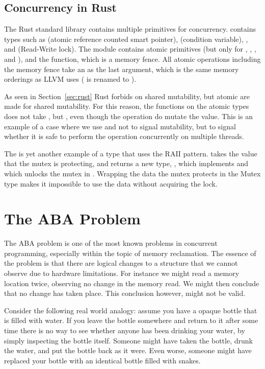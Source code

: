 \documentclass[b5paper]{report}
\begin{document}
\subsection{Concurrency in Rust}

The Rust standard library contains multiple primitives for concurrency.
 contains types such as  (atomic reference counted
smart pointer),  (condition variable), , and
 (Read-Write lock). The  module contains
atomic primitives (but only for , , , and
), and the  function, which is a memory fence. All atomic
operations including the memory fence take an  as the last
argument, which is the same memory orderings as LLVM uses ( is
renamed to ).

As seen in Section~\ref{sec:rust} Rust forbids on shared mutability, but atomic
are made for shared mutability. For this reason, the functions on the atomic
types does not take , but , even though the
operation do mutate the value. This is an example of a case where we use
 and \code{\&} not to signal mutability, but to signal whether it
is safe to perform the operation concurrently on multiple threads.

The  is yet another example of a type that uses the RAII pattern.
 takes the value that the mutex is protecting, and
 returns a new type, , which implements
 and which unlocks the mutex in . Wrapping the data
the mutex protects in the Mutex type makes it impossible to use the data without
acquiring the lock.


\section{The ABA Problem\label{sec:aba}}

The ABA problem is one of the most known problems in concurrent programming,
especially within the topic of memory reclamation. The essence of the problem is
that there are logical changes to a structure that we cannot observe due to
hardware limitations. For instance we might read a memory location twice,
observing no change in the memory read. We might then conclude that no change
has taken place. This conclusion however, might not be valid.

Consider the following real world analogy: assume you have a opaque bottle that
is filled with water. If you leave the bottle somewhere and return to it after
some time there is no way to see whether anyone has been drinking your water, by
simply inspecting the bottle itself. Someone might have taken the bottle, drunk
the water, and put the bottle back as it were. Even worse, someone might have
replaced your bottle with an identical bottle filled with snakes.
\end{document}
